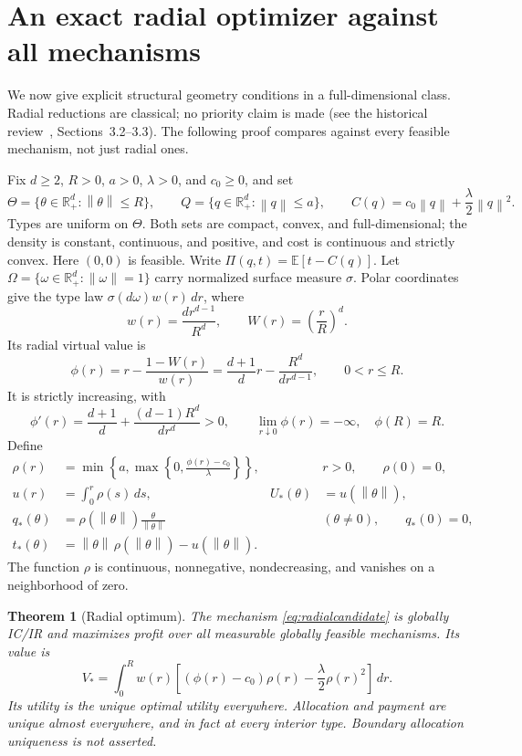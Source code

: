 \documentclass[11pt,a4paper]{article}
\numberwithin{equation}{section}
\newtheorem{theorem}{Theorem}
\newcommand{\R}{\mathbb R}
\newcommand{\E}{\mathbb E}
\newcommand{\norm}[1]{\left\lVert #1\right\rVert}
\begin{document}
\section{An exact radial optimizer against all mechanisms}\label{sec:radial}
We now give explicit structural geometry conditions in a full-dimensional
class. Radial reductions are classical; no priority claim is made
(see the historical review~\cite{Rochet2024}, Sections~3.2--3.3).
The following proof compares against every feasible mechanism, not just
radial ones.

Fix \(d\ge2\), \(R>0\), \(a>0\), \(\lambda>0\), and \(c_0\ge0\), and set
\[
 \Theta=\{\theta\in\R_+^d:\norm\theta\le R\},\qquad
 Q=\{q\in\R_+^d:\norm q\le a\},\qquad
 C(q)=c_0\norm q+\frac{\lambda}{2}\norm q^2.
\]
Types are uniform on \(\Theta\). Both sets are compact, convex, and
full-dimensional; the density is constant, continuous, and positive,
and cost is continuous and strictly convex. Here \((0,0)\) is feasible.
Write \(\Pi(q,t)=\E[t-C(q)]\).
Let \(\Omega=\{\omega\in\R_+^d:\norm\omega=1\}\) carry normalized
surface measure \(\sigma\). Polar coordinates give the type law
\(\sigma(d\omega)w(r)\,dr\), where
\[
 w(r)=\frac{dr^{d-1}}{R^d},\qquad W(r)=\left(\frac rR\right)^d.
\]
Its radial virtual value is
\begin{equation}\label{eq:virtual}
 \phi(r)=r-\frac{1-W(r)}{w(r)}
 =\frac{d+1}{d}r-\frac{R^d}{dr^{d-1}},\qquad 0<r\le R.
\end{equation}
It is strictly increasing, with
\[
 \phi'(r)=\frac{d+1}{d}+\frac{(d-1)R^d}{dr^d}>0,\qquad
 \lim_{r\downarrow0}\phi(r)=-\infty,\quad \phi(R)=R.
\]
Define
\begin{equation}\label{eq:radialcandidate}
 \begin{aligned}
 \rho(r)&=\min\left\{a,\max\left\{0,\frac{\phi(r)-c_0}{\lambda}\right\}\right\},
          &&r>0,\qquad \rho(0)=0,\\
 u(r)&=\int_0^r\rho(s)\,ds,& U_*(\theta)&=u(\norm\theta),\\
 q_*(\theta)&=\rho(\norm\theta)\frac{\theta}{\norm\theta}
          &&(\theta\ne0),\qquad q_*(0)=0,\\
 t_*(\theta)&=\norm\theta\,\rho(\norm\theta)-u(\norm\theta).
 \end{aligned}
\end{equation}
The function \(\rho\) is continuous, nonnegative, nondecreasing, and
vanishes on a neighborhood of zero.

\begin{theorem}[Radial optimum]\label{thm:radial}
The mechanism \eqref{eq:radialcandidate} is globally IC/IR and maximizes
profit over all measurable globally feasible mechanisms.
Its value is
\begin{equation}\label{eq:radialvalue}
 V_*=\int_0^Rw(r)\left[(\phi(r)-c_0)\rho(r)
                         -\frac{\lambda}{2}\rho(r)^2\right]\,dr.
\end{equation}
Its utility is the unique optimal utility everywhere. Allocation and
payment are unique almost everywhere, and in fact at every interior type.
Boundary allocation uniqueness is not asserted.
\end{theorem}
\end{document}
